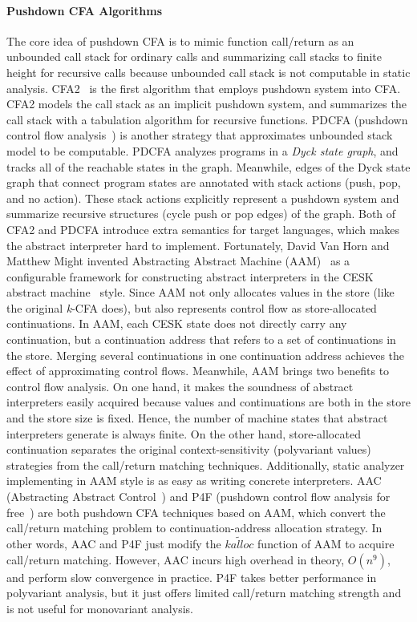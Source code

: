 \documentclass{article}
\begin{document}
\paragraph{Pushdown CFA Algorithms}
The core idea of pushdown CFA is to mimic function call/return as an unbounded call stack for ordinary calls and summarizing call stacks to finite height for recursive calls because unbounded call stack is not computable in static analysis.
CFA2~\cite{vardoulakis2010cfa2} is the first algorithm that employs pushdown system into CFA\@.
CFA2 models the call stack as an implicit pushdown system, and summarizes the call stack with a tabulation algorithm for recursive functions.
PDCFA (pushdown control flow analysis~\cite{earl2010pushdown})
is another strategy that approximates unbounded stack model to be computable.
PDCFA analyzes programs in a \emph{Dyck state graph}, and tracks all of the reachable states in the graph.
Meanwhile, edges of the Dyck state graph that connect program states are annotated with stack actions (push, pop, and no action).
These stack actions explicitly represent a pushdown system and summarize recursive structures (cycle push or pop edges) of the graph.
Both of CFA2 and PDCFA introduce extra semantics for target languages, which makes the abstract interpreter hard to implement.
Fortunately, David Van Horn and Matthew Might
invented Abstracting Abstract Machine (AAM)~\cite{van2010abstracting}
as a configurable framework for constructing abstract interpreters in the CESK abstract machine~\cite{felleisen1987calculus} style.
Since AAM not only allocates values in the store (like the original \textit{k}-CFA does), but also represents control flow as store-allocated continuations.
In AAM, each CESK state does not directly carry any continuation, but a continuation address that refers to a set of continuations in the store.
Merging several continuations in one continuation address achieves the effect of approximating control flows.
Meanwhile, AAM brings two benefits to control flow analysis.
On one hand, it makes the soundness of abstract interpreters easily acquired because values and continuations are both in the store and
the store size is fixed.
Hence, the number of machine states that abstract interpreters generate is always finite.
On the other hand, store-allocated continuation separates the original context-sensitivity (polyvariant values) strategies from
the call/return matching techniques.
Additionally, static analyzer implementing in AAM style is as easy as writing concrete interpreters.
AAC (Abstracting Abstract Control~\cite{johnson2015abstracting}) and P4F (pushdown control flow analysis for free~\cite{gilray2016pushdown})
are both pushdown CFA techniques based on AAM\@, which convert the call/return matching problem to continuation-address allocation strategy.
In other words, AAC and P4F just modify the $\widetilde{kalloc}$ function of AAM to acquire call/return matching.
However, AAC incurs high overhead in theory, $O(n^9)$, and perform slow convergence in practice. %
P4F takes better performance in polyvariant analysis, but it just offers limited call/return matching strength and is not useful for monovariant analysis.
\end{document}
